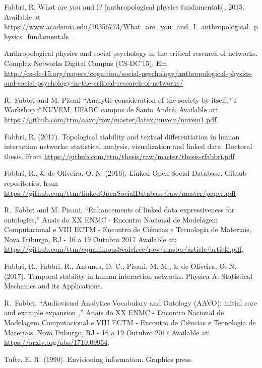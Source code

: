 \documentclass[letterpaper,10pt]{article}
\begin{document}
\begin{thebibliography}{99}

	Fabbri, R. What are you and I? [anthropological physics fundamentals], 2015. Available at \url{https://www.academia.edu/10356773/What\_are\_you\_and\_I\_anthropological\_physics\_fundamentals\_}

	Anthropological physics and social psychology in the critical research of networks. Complex Networks Digital Campus (CS-DC'15).
	Em \\\url{http://cs-dc-15.org/papers/cognition/social-psychology/anthropological-physics-and-social-psychology-in-the-critical-research-of-networks/}

  R.~Fabbri and M. Pisani
  ``Analytic consideration of the society by itself,''
  I Workshop @NUVEM, UFABC campus de Santo André,
		Available at: \url{https://github.com/ttm/aavo/raw/master/latex/nuvem/nuvem1.pdf}.

Fabbri, R. (2017). Topological stability and textual differentiation in human interaction networks:
		statistical analysis, visualization and linked data. Doctoral thesis.
		From \url{https://github.com/ttm/thesis/raw/master/thesis-rfabbri.pdf}

	Fabbri, R., \& de Oliveira, O. N. (2016). Linked Open Social Database. Github repositories, from \url{https://github.com/ttm/linkedOpenSocialDatabase/raw/master/paper.pdf}

  R.~Fabbri and M. Pisani,
  ``Enhancements of linked data expressiveness for ontologies,''
  Anais do XX ENMC - Encontro Nacional de Modelagem Computacional e
  VIII ECTM - Encontro de Ci\^encias e Tecnologia de Materiais, Nova Friburgo,
  RJ - 16 a 19 Outubro 2017
		Available at: \url{https://github.com/ttm/equanimousScalefree/raw/master/article/article.pdf}.

Fabbri, R., Fabbri, R., Antunes, D. C., Pisani, M. M., \& de Oliveira, O. N. (2017). Temporal stability in human interaction networks. Physica A: Statistical Mechanics and its Applications.

  R.~Fabbri,
		``Audiovisual Analytics Vocabulary and Ontology (AAVO): initial core and example expansion ,''
  Anais do XX ENMC - Encontro Nacional de Modelagem Computacional e
  VIII ECTM - Encontro de Ci\^encias e Tecnologia de Materiais, Nova Friburgo,
  RJ - 16 a 19 Outubro 2017
		Available at: \url{https://arxiv.org/abs/1710.09954}.

	Tufte, E. R. (1990). Envisioning information. Graphics press.

\end{thebibliography}
\end{document}
